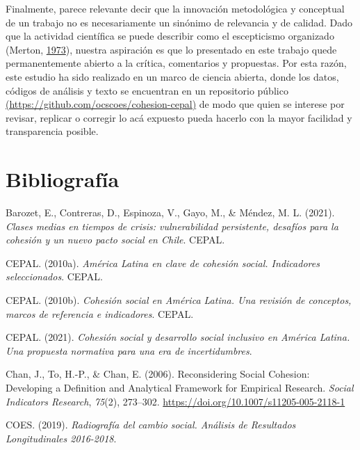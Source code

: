 \documentclass[
  12pt,
]{book}
\begin{document}
Finalmente, parece relevante decir que la innovación metodológica y conceptual de un trabajo no es necesariamente un sinónimo de relevancia y de calidad. Dado que la actividad científica se puede describir como el escepticismo organizado (Merton, \protect\hyperlink{ref-merton_sociology_1973}{1973}), nuestra aspiración es que lo presentado en este trabajo quede permanentemente abierto a la crítica, comentarios y propuestas. Por esta razón, este estudio ha sido realizado en un marco de ciencia abierta, donde los datos, códigos de análisis y texto se encuentran en un repositorio público \href{https://github.com/ocscoes/cohesion-cepal}{(https://github.com/ocscoes/cohesion-cepal)} de modo que quien se interese por revisar, replicar o corregir lo acá expuesto pueda hacerlo con la mayor facilidad y transparencia posible.

\hypertarget{bibliografuxeda}{%
\chapter*{Bibliografía}\label{bibliografuxeda}}

\hypertarget{refs}{}
\leavevmode\hypertarget{ref-barozet_clases_2021}{}%
Barozet, E., Contreras, D., Espinoza, V., Gayo, M., \& Méndez, M. L. (2021). \emph{Clases medias en tiempos de crisis: vulnerabilidad persistente, desafíos para la cohesión y un nuevo pacto social en Chile}. CEPAL.

\leavevmode\hypertarget{ref-cepal_america_2010}{}%
CEPAL. (2010a). \emph{América Latina en clave de cohesión social. Indicadores seleccionados}. CEPAL.

\leavevmode\hypertarget{ref-cepal_cohesion_2010}{}%
CEPAL. (2010b). \emph{Cohesión social en América Latina. Una revisión de conceptos, marcos de referencia e indicadores}. CEPAL.

\leavevmode\hypertarget{ref-cepal_cohesion_2021}{}%
CEPAL. (2021). \emph{Cohesión social y desarrollo social inclusivo en América Latina. Una propuesta normativa para una era de incertidumbres}.

\leavevmode\hypertarget{ref-chan_reconsidering_2006}{}%
Chan, J., To, H.-P., \& Chan, E. (2006). Reconsidering Social Cohesion: Developing a Definition and Analytical Framework for Empirical Research. \emph{Social Indicators Research}, \emph{75}(2), 273--302. \url{https://doi.org/10.1007/s11205-005-2118-1}

\leavevmode\hypertarget{ref-coes_radiografia_2019}{}%
COES. (2019). \emph{Radiografía del cambio social. Análisis de Resultados Longitudinales 2016-2018}.
\end{document}

